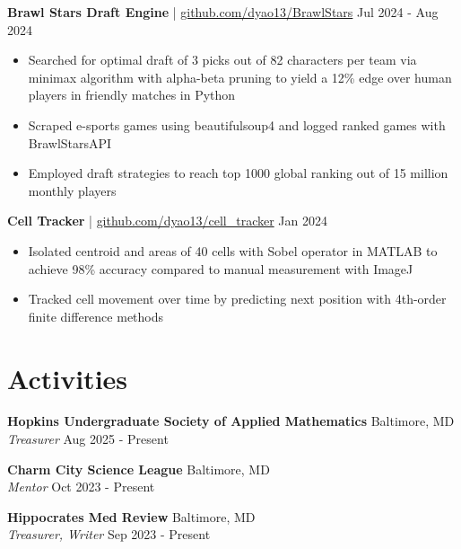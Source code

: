 \documentclass[11pt]{article}       %
\begin{document}
\textbf{Brawl Stars Draft Engine} | \href{https://github.com/dyao13/BrawlStars}{github.com/dyao13/BrawlStars} \hfill Jul 2024 - Aug 2024 \vspace{-9pt} \\
\begin{itemize}
  \item Searched for optimal draft of 3 picks out of 82 characters per team via minimax algorithm with alpha-beta pruning to yield a 12\% edge over human players in friendly matches in Python
  \item Scraped e-sports games using beautifulsoup4 and logged ranked games with BrawlStarsAPI
  \item Employed draft strategies to reach top 1000 global ranking out of 15 million monthly players
\end{itemize}

\textbf{Cell Tracker} | \href{https://github.com/dyao13/cell_tracker}{github.com/dyao13/cell\_tracker} \hfill Jan 2024 \vspace{-9pt} \\
\begin{itemize}
  \item Isolated centroid and areas of 40 cells with Sobel operator in MATLAB to achieve 98\% accuracy compared to manual measurement with ImageJ
  \item Tracked cell movement over time by predicting next position with 4th-order finite difference methods
\end{itemize}

\vspace{-18.5pt}

\section*{Activities}

\textbf{Hopkins Undergraduate Society of Applied Mathematics} \hfill Baltimore, MD \\
\textit{Treasurer} \hfill Aug 2025 - Present \\

\vspace{5pt}

\textbf{Charm City Science League} \hfill Baltimore, MD \\
\textit{Mentor} \hfill Oct 2023 - Present

\vspace{5pt}

\textbf{Hippocrates Med Review} \hfill Baltimore, MD \\
\textit{Treasurer, Writer} \hfill Sep 2023 - Present \\
\end{document}
